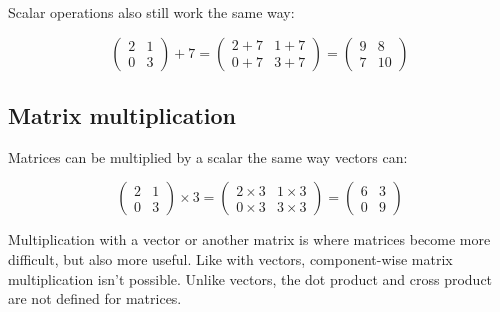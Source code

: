 Scalar operations also still work the same way:

\begin{equation*}
    \begin{pmatrix}
    2 & 1\\
    0 & 3
    \end{pmatrix} +7=\begin{pmatrix}
    2+7 & 1+7\\
    0+7 & 3+7
    \end{pmatrix} =\begin{pmatrix}
    9 & 8\\
    7 & 10
    \end{pmatrix}
\end{equation*}

\subsection{\textsf{Matrix multiplication}}
Matrices can be multiplied by a scalar the same way vectors can:

\begin{equation*}
    \begin{pmatrix}
    2 & 1\\
    0 & 3
    \end{pmatrix} \times 3=\begin{pmatrix}
    2\times 3 & 1\times 3\\
    0\times 3 & 3\times 3
    \end{pmatrix} =\begin{pmatrix}
    6 & 3\\
    0 & 9
    \end{pmatrix}
\end{equation*}

Multiplication with a vector or another matrix is where matrices become more difficult, but also more useful. Like with vectors, component-wise matrix multiplication isn't possible. Unlike vectors, the dot product and cross product are not defined for matrices.
